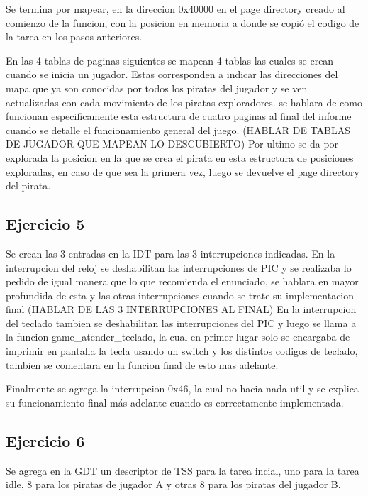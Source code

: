 Se termina por mapear, en la direccion 0x40000 en el page directory creado al comienzo de la funcion, con
la posicion en memoria a donde se copió el codigo de la tarea en los pasos anteriores.

En las 4 tablas de paginas siguientes se mapean 4 tablas las cuales se crean cuando se inicia un jugador.
Estas corresponden a indicar las direcciones del mapa que ya son conocidas por todos los piratas del jugador
y se ven actualizadas con cada movimiento de los piratas exploradores. se hablara de como funcionan especificamente
esta estructura de cuatro paginas al final del informe cuando se detalle el funcionamiento general del juego.   (HABLAR DE TABLAS DE JUGADOR QUE MAPEAN LO DESCUBIERTO)
Por ultimo se da por explorada la posicion en la que se crea el pirata en esta estructura de posiciones exploradas,
en caso de que sea la primera vez, luego se devuelve el page directory del pirata.


\subsection{Ejercicio 5}

Se crean las 3 entradas en la IDT para las 3 interrupciones indicadas.
En la interrupcion del reloj se deshabilitan las interrupciones de PIC
y se realizaba lo pedido de igual manera que lo que recomienda el enunciado, se hablara
en mayor profundida de esta y las otras interrupciones cuando se trate su implementacion final                            (HABLAR DE LAS 3 INTERRUPCIONES AL FINAL)
En la interrupcion del teclado tambien se deshabilitan las interrupciones del PIC y luego se llama a
la funcion game_atender_teclado, la cual en primer lugar solo se encargaba de imprimir en pantalla la tecla
usando un switch y los distintos codigos de teclado, tambien se comentara en la funcion final de esto mas adelante.

Finalmente se agrega la interrupcion 0x46, la cual no hacia nada util y se explica su funcionamiento final más
adelante cuando es correctamente implementada.



\subsection{Ejercicio 6}

Se agrega en la GDT un descriptor de TSS para la tarea incial, uno para la tarea idle, 8 para los piratas de jugador A
y otras 8 para los piratas del jugador B.

